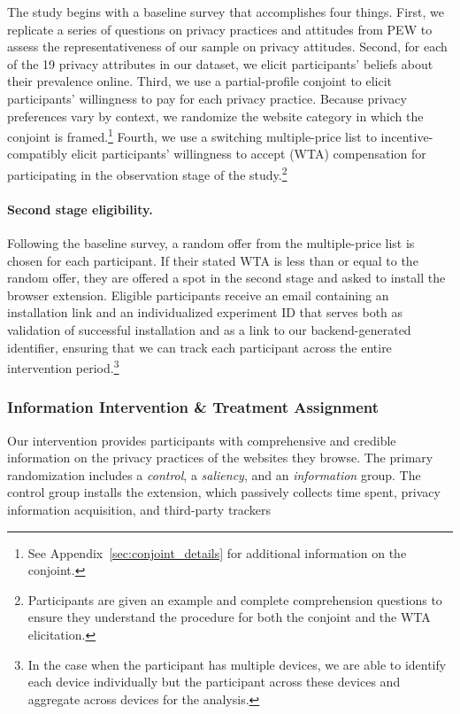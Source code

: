 \documentclass[12pt]{article}
\theoremstyle{definition}
\theoremstyle{remark}
\begin{document}
\begin{figure}[H]
\end{figure}

The study begins with a baseline survey that accomplishes four things. First, we replicate a series of questions on privacy practices and attitudes from PEW \citep{PewPrivacy} to assess the representativeness of our sample on privacy attitudes. Second, for each of the 19 privacy attributes in our dataset, we elicit participants' beliefs about their prevalence online. Third, we use a partial-profile conjoint \citep{doi:10.1287/inte.31.3s.56.9676, ALLENBY2019151} to elicit participants' willingness to pay for each privacy practice. Because privacy preferences vary by context, we randomize the website category in which the conjoint is framed.\footnote{See Appendix~\ref{sec:conjoint_details} for additional information on the conjoint.} Fourth, we use a switching multiple-price list \citep{andersen2006elicitation} to incentive-compatibly elicit participants' willingness to accept (WTA) compensation for participating in the observation stage of the study.\footnote{Participants are given an example and complete comprehension questions to ensure they understand the procedure for both the conjoint and the WTA elicitation.}
 
\paragraph{Second stage eligibility.} Following the baseline survey, a random offer from the multiple-price list is chosen for each participant. If their stated WTA is less than or equal to the random offer, they are offered a spot in the second stage and asked to install the browser extension. Eligible participants receive an email containing an installation link and an individualized experiment ID that serves both as validation of successful installation and as a link to our backend-generated identifier, ensuring that we can track each participant across the entire intervention period.\footnote{In the case when the participant has multiple devices, we are able to identify each device individually but the participant across these devices and aggregate across devices for the analysis.}

\subsubsection{Information Intervention \& Treatment Assignment}

Our intervention provides participants with comprehensive and credible information on the privacy practices of the websites they browse. The primary randomization includes a \textit{control}, a \textit{saliency}, and an \textit{information} group. The control group installs the extension, which passively collects time spent, privacy information acquisition, and third-party trackers
\end{document}
